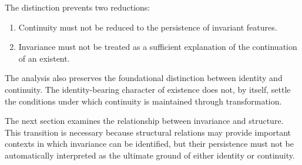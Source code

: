 The distinction prevents two
reductions:

\begin{enumerate}
    \item Continuity must not be
    reduced to the persistence
    of invariant features.

    \item Invariance must not be
    treated as a sufficient
    explanation of the continuation
    of an existent.
\end{enumerate}

The analysis also preserves the
foundational distinction between
identity and continuity. The
identity-bearing character of
existence does not, by itself,
settle the conditions under
which continuity is maintained
through transformation.

The next section examines the
relationship between invariance
and structure. This transition
is necessary because structural
relations may provide important
contexts in which invariance
can be identified, but their
persistence must not be
automatically interpreted as
the ultimate ground of either
identity or continuity.

